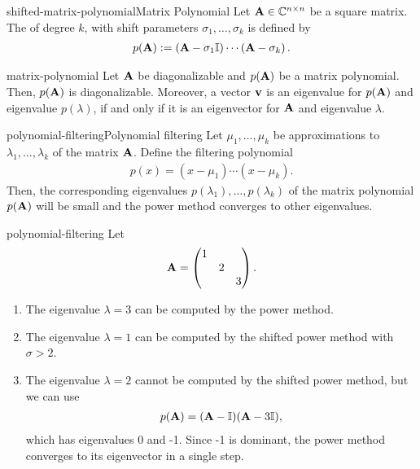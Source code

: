 
\begin{Definition*}{shifted-matrix-polynomial}{Matrix Polynomial}
  Let \(\mathbf A \in \mathbb C^{n \times n}\) be a square matrix.
  The  of degree \(k\), with shift parameters \(\sigma_1, \ldots, \sigma_k\) is defined by
  \begin{gather}
    p(\mathbf A) := \left(\mathbf A - \sigma_1 \mathbb I \right) \cdots \left(\mathbf A - \sigma_k\right).
  \end{gather}
\end{Definition*}

\begin{Lemma}{matrix-polynomial}
  Let $\mathbf A$ be diagonalizable and $p(\mathbf A)$ be a matrix
  polynomial. Then, $p(\mathbf A)$ is diagonalizable. Moreover, a vector
  $\mathbf v$ is an eigenvalue for $p(\mathbf A)$ and eigenvalue $p(\lambda)$,
  if and only if it is an eigenvector for $\mathbf A$ and eigenvalue $\lambda$.
\end{Lemma}

\begin{Algorithm*}{polynomial-filtering}{Polynomial filtering}
  Let $\mu_1,\dots,\mu_k$ be approximations to  $\lambda_1,\dots,\lambda_k$ of the matrix
  $\mathbf A$. Define the filtering polynomial
  \begin{gather}
    p(x) = (x-\mu_1)\cdots(x-\mu_k).
  \end{gather}
  Then, the corresponding eigenvalues
  $p(\lambda_1),\dots,p(\lambda_k)$ of the matrix polynomial
  $p(\mathbf A)$ will be small and the power method converges to other
  eigenvalues.
\end{Algorithm*}

\begin{Example}{polynomial-filtering}
  Let
  \begin{gather}
    \mathbf A =
    \begin{pmatrix}
      1&&\\ &2& \\ &&3
    \end{pmatrix}.
  \end{gather}
  \begin{enumerate}
  \item The eigenvalue $\lambda=3$ can be computed by the power method.
  \item The eigenvalue $\lambda=1$ can be computed by the shifted power method with $\sigma>2$.
  \item The eigenvalue $\lambda=2$ cannot be computed by the shifted power method, but we can use
    \begin{gather}
      p(\mathbf A) = (\mathbf A-\mathbb I)(\mathbf A-3\mathbb I),
    \end{gather}
    which has eigenvalues 0 and -1. Since -1 is dominant, the power
    method converges to its eigenvector in a single step.
  \end{enumerate}
\end{Example}

